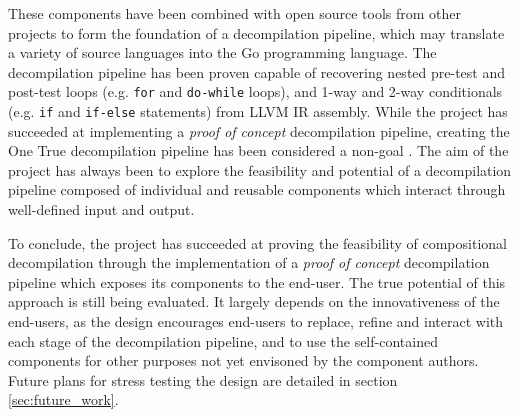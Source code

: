 These components have been combined with open source tools from other projects to form the foundation of a decompilation pipeline, which may translate a variety of source languages into the Go programming language. The decompilation pipeline has been proven capable of recovering nested pre-test and post-test loops (e.g. \texttt{for} and \texttt{do-while} loops), and 1-way and 2-way conditionals (e.g. \texttt{if} and \texttt{if-else} statements) from LLVM IR assembly. While the project has succeeded at implementing a \textit{proof of concept} decompilation pipeline, creating the One True decompilation pipeline has been considered a non-goal \cite{non-goals}. The aim of the project has always been to explore the feasibility and potential of a decompilation pipeline composed of individual and reusable components which interact through well-defined input and output.

To conclude, the project has succeeded at proving the feasibility of compositional decompilation through the implementation of a \textit{proof of concept} decompilation pipeline which exposes its components to the end-user. The true potential of this approach is still being evaluated. It largely depends on the innovativeness of the end-users, as the design encourages end-users to replace, refine and interact with each stage of the decompilation pipeline, and to use the self-contained components for other purposes not yet envisoned by the component authors. Future plans for stress testing the design are detailed in section \ref{sec:future_work}.
